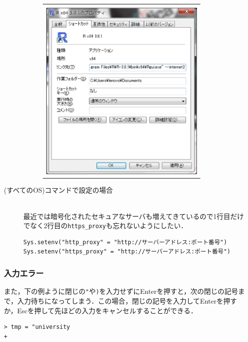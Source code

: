\begin{description}
\begin{figure}[H]
\begin{center}
\begin{tabular}{c}
\begin{minipage}{0.65\hsize}
          にする．\\
          \includegraphics[width=8.2cm]{img/property.eps}
      \end{minipage}
    \end{tabular}
  \end{center}
\end{figure}
\item[(すべてのOS)コマンドで設定の場合]\mbox{}\\
最近では暗号化されたセキュアなサーバも増えてきているので1行目だけでなく2行目の\verb+https_proxy+も忘れないようにしたい．
\begin{screen}
\begin{verbatim}
Sys.setenv("http_proxy" = "http://サーバーアドレス:ポート番号")
Sys.setenv("https_proxy" = "http://サーバーアドレス:ポート番号")
\end{verbatim}
\end{screen}
\end{description}
\subsubsection{入力エラー}
また，下の例ように閉じの\verb+"+や\verb+)+を入力せずにEnterを押すと，次の閉じの記号まで，入力待ちになってしまう．この場合，閉じの記号を入力してEnterを押すか，Escを押して先ほどの入力をキャンセルすることができる．
\begin{breakbox}
\begin{verbatim}
> tmp = "university
+ 
\end{verbatim}
\end{breakbox}